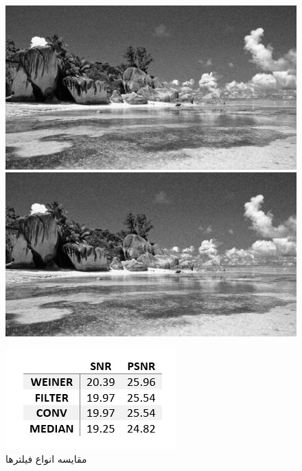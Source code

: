 {    \begin{figure}[H]
        \centering
        \begin{minipage}[b]{0.4\textwidth}
            \includegraphics[width=\textwidth]{Images/Denoised_conv.jpg}
            \caption{}
        \end{minipage}
        \begin{minipage}[b]{0.4\textwidth}
            \includegraphics[width=\textwidth]{Images/Denoised_medfilt.jpg}
            \caption{}
        \end{minipage}
    \end{figure}
    
    \begin{figure}[H]
        \includegraphics[]{Images/Table.jpg}
        \centering
        \caption{مقایسه انواع فیلتر‌ها}
    \end{figure}
    
}
